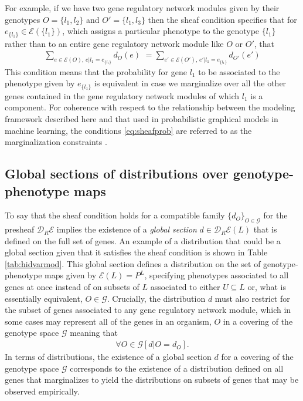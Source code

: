 For example, if we have two gene regulatory network modules given by their genotypes $O = \{l_1, l_2\}$ and $O' = \{l_1, l_3\}$ then the sheaf condition specifies that for $e_{\{l_1\}} \in \mathcal{E}(\{l_1\})$, which assigns a particular phenotype to the genotype $\{l_1\}$ rather than to an entire gene regulatory network module like $O$ or $O'$, that
\begin{eqnarray}\label{eq:sheafprob}
\sum_{e \in \mathcal{E}(O),\, e|l_1=e_{\{l_1\}}} d_O(e) \,\, = \sum_{e' \in \mathcal{E}(O'),\, e'|l_1=e_{\{l_1\}}} d_{O'}(e')
\end{eqnarray}
This condition means that the probability for gene $l_1$ to be associated to the phenotype given by $e_{\{l_1\}}$ is equivalent in case we marginalize over all the other genes contained in the gene regulatory network modules of which $l_1$ is a component. For coherence with respect to the relationship between the modeling framework described here and that used in probabilistic graphical models in machine learning, the conditions \ref{eq:sheafprob} are referred to as the marginalization constraints \cite{Wainwright2007}.

\subsection*{Global sections of distributions over genotype-phenotype maps}
To say that the sheaf condition holds for a compatible family $\{d_O\}_{O \in \mathcal{G}}$ for the presheaf $\mathcal{D}_R\mathcal{E}$ implies the existence of a \emph{global section} $d \in \mathcal{D}_R\mathcal{E}(L)$ that is defined on the full set of genes. An example of a distribution that could be a global section given that it satisfies the sheaf condition is shown in Table \ref{tab:hidvarmod}. This global section defines a distribution on the set of genotype-phenotype maps given by $\mathcal{E}(L) = P^L$, specifying phenotypes associated to all genes at once instead of on subsets of $L$ associated to either $U \subseteq L$ or, what is essentially equivalent, $O \in \mathcal{G}$. Crucially, the distribution $d$ must also restrict for the subset of genes associated to any gene regulatory network module, which in some cases may represent all of the genes in an organism, $O$ in a covering of the genotype space $\mathcal{G}$ meaning that
\begin{eqnarray}
\forall O \in \mathcal{G} \left[ d|O = d_O \right].
\end{eqnarray}
In terms of distributions, the existence of a global section $d$ for a covering of the genotype space $\mathcal{G}$ corresponds to the existence of a distribution defined on all genes that marginalizes to yield the distributions on subsets of genes that may be observed empirically.

